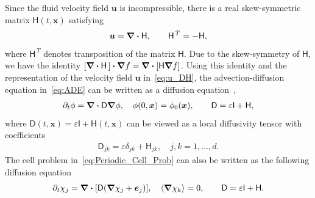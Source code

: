 \documentclass[leqno,onefignum,onetabnum]{siamltex1213}
\newcommand{\Dm}{\mathsf{D}}
\newcommand{\Hm}{\mathsf{H}}
\newcommand{\Ib}{\mathsf{I}}
\newcommand\bnabla{\mbox{\boldmath${\nabla}$}}
\providecommand\bcdot{\boldsymbol{\cdot}}
\newcommand{\vecx}{\boldsymbol{x}}
\newcommand{\vecu}{\boldsymbol{u}}
\newcommand{\vece}{\boldsymbol{e}}
\begin{document}
Since the fluid velocity field $\vecu$ is incompressible, there is a
real skew-symmetric matrix $\Hm(t,\vecx)$
satisfying~\cite{Avellaneda:PRL-753,Avellaneda:CMP-339}   
% 
\begin{align}\label{eq:u_DH}
 \vecu =\bnabla \bcdot\Hm, \qquad   \Hm^{\,T}=-\Hm,
\end{align}
% 
where $\Hm^{\,T}$ denotes transposition of the matrix $\Hm$. Due to
the skew-symmetry of $\Hm$, we have the identity
$[\bnabla\bcdot\Hm\,]\bcdot\bnabla f=\bnabla\bcdot[\Hm\bnabla f]$. Using
this identity and the representation of the velocity field $\vecu$
in~\eqref{eq:u_DH}, the advection-diffusion equation in~\eqref{eq:ADE}
can be written as a diffusion
equation~\cite{Fannjiang:1994:SIAM_JAM:333},    
%
\begin{align}\label{eq:ADE_Divergence}
  \partial_t\phi%
    =\bnabla \bcdot\Dm\bnabla \phi, \quad
    \phi(0,\vecx)=\phi_0(\vecx),
    \qquad
    \Dm=\varepsilon\Ib+\Hm,
\end{align}
%
where $\Dm(t,\vecx)=\varepsilon\Ib+\Hm(t,\vecx)$ can be viewed as a local
diffusivity tensor with coefficients
%
\begin{align}\label{eq:kappa_coeff}
  \Dm_{jk}=\varepsilon\delta_{jk}+\Hm_{jk},\quad j,k=1,\ldots,d.
\end{align}
%
The cell problem in~\eqref{eq:Periodic_Cell_Prob} can also be
written as the following diffusion
equation~\cite{Fannjiang:1994:SIAM_JAM:333}     
% 
\begin{align}\label{eq:Cell_Problem_Hm}
  \partial_t\chi_j=\bnabla \bcdot[\Dm(\bnabla \chi_j+\vece_j)],
  \quad
  \langle\bnabla \chi_k\rangle=0, \qquad
  \Dm=\varepsilon\Ib+\Hm.
\end{align}
%
\end{document}
